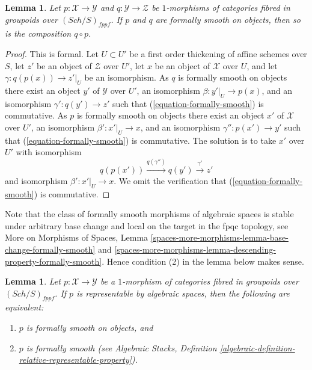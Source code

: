 \documentclass{stacks-project}
\theoremstyle{plain}
\newtheorem{lemma}[subsection]{Lemma}
\theoremstyle{definition}
\theoremstyle{remark}
\numberwithin{equation}{subsection}
\def\Sch{\mathit{Sch}}
\begin{document}
\begin{lemma}
\label{lemma-composition-formally-smooth}
Let $p : \mathcal{X} \to \mathcal{Y}$ and $q : \mathcal{Y} \to \mathcal{Z}$
be $1$-morphisms of categories fibred in groupoids over $(\Sch/S)_{fppf}$.
If $p$ and $q$ are formally smooth on objects, then so is the composition
$q \circ p$.
\end{lemma}

\begin{proof}
This is formal. Let $U \subset U'$ be a first order thickening
of affine schemes over $S$, let $z'$ be an object of $\mathcal{Z}$
over $U'$, let $x$ be an object of $\mathcal{X}$ over $U$,
and let $\gamma : q(p(x)) \to z'|_U$ be an isomorphism. As $q$ is
formally smooth on objects there exist an object
$y'$ of $\mathcal{Y}$ over $U'$, an isomorphism
$\beta : y'|_U \to p(x)$, and an isomorphism $\gamma' : q(y') \to z'$
such that (\ref{equation-formally-smooth}) is commutative. As $p$ is
formally smooth on objects there exist an object
$x'$ of $\mathcal{X}$ over $U'$, an isomorphism
$\beta' : x'|_U \to x$, and an isomorphism $\gamma'' : p(x') \to y'$
such that (\ref{equation-formally-smooth}) is commutative.
The solution is to take $x'$ over $U'$ with isomorphism
$$
q(p(x')) \xrightarrow{q(\gamma'')} q(y') \xrightarrow{\gamma'} z'
$$
and isomorphism $\beta' : x'|_U \to x$. We omit the verification
that (\ref{equation-formally-smooth}) is commutative.
\end{proof}

\noindent
Note that the class of formally smooth morphisms of algebraic spaces is
stable under arbitrary base change and local on the target in the
fpqc topology, see
More on Morphisms of Spaces,
Lemma \ref{spaces-more-morphisms-lemma-base-change-formally-smooth} and
\ref{spaces-more-morphisms-lemma-descending-property-formally-smooth}.
Hence condition (2) in the lemma below makes sense.

\begin{lemma}
\label{lemma-representable-by-spaces-formally-smooth}
Let $p : \mathcal{X} \to \mathcal{Y}$ be a $1$-morphism of categories
fibred in groupoids over $(\Sch/S)_{fppf}$. If $p$ is
representable by algebraic spaces, then the following are equivalent:
\begin{enumerate}
\item $p$ is formally smooth on objects, and
\item $p$ is formally smooth (see
Algebraic Stacks,
Definition \ref{algebraic-definition-relative-representable-property}).
\end{enumerate}
\end{lemma}
\end{document}
